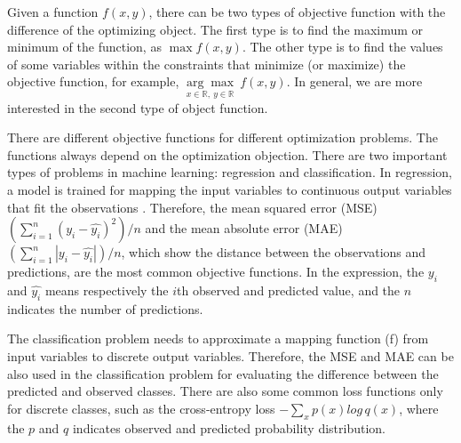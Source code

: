 Given a function $f(x,y)$, there can be two types of objective function with the difference of the optimizing object. The first type is to find the maximum or minimum of the function, as $\max f(x,y)$. The other type is to find the values of some variables within the constraints that minimize (or maximize) the objective function, for example, $\underset{x\in \mathbb R,\ y\in \mathbb R}{\arg \max }\ f(x,y)$. In general, we are more interested in the second type of object function.


There are different objective functions for different optimization problems. The functions always depend on the optimization objection. There are two important types of problems in machine learning: regression and classification. In regression, a model is trained for mapping the input variables to continuous output variables that fit the observations \cite{balasubramanian2014conformal}. Therefore, the mean squared error (MSE) $(\sum _{i=1}^{n}(y_{i}-{\hat {y_{i}}})^{2})/n$ and the mean absolute error (MAE) $(\sum_{i=1}^{n} \left | y_{i}-\hat{y_{i}} \right |)/n$, which show the distance between the observations and predictions, are the most common objective functions. In the expression, the $y_{i}$ and $\hat{y_{i}}$ means respectively the $i$th observed and predicted value, and the $n$ indicates the number of predictions. 

The classification problem needs to approximate a mapping function (f) from input variables to discrete output variables. Therefore, the MSE and MAE can be also used in the classification problem for evaluating the difference between the predicted and observed classes. There are also some common loss functions only for discrete classes, such as the cross-entropy loss $-\sum_x p(x)log\,q(x)$, where the $p$ and $q$ indicates observed and predicted probability distribution.









